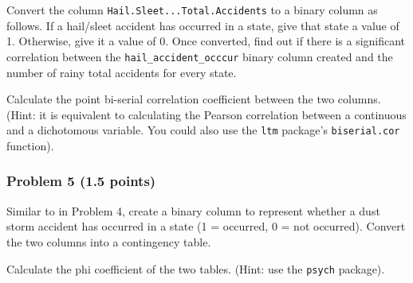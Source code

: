 \documentclass[
]{article}
\begin{document}
Convert the column \texttt{Hail.Sleet...Total.Accidents} to a binary
column as follows. If a hail/sleet accident has occurred in a state,
give that state a value of 1. Otherwise, give it a value of 0. Once
converted, find out if there is a significant correlation between the
\texttt{hail\_accident\_occcur} binary column created and the number of
rainy total accidents for every state.

Calculate the point bi-serial correlation coefficient between the two
columns. (Hint: it is equivalent to calculating the Pearson correlation
between a continuous and a dichotomous variable. You could also use the
\texttt{ltm} package's \texttt{biserial.cor} function).

\hypertarget{problem-5-1.5-points}{%
\subsubsection{Problem 5 (1.5 points)}\label{problem-5-1.5-points}}

Similar to in Problem 4, create a binary column to represent whether a
dust storm accident has occurred in a state (1 = occurred, 0 = not
occurred). Convert the two columns into a contingency table.

Calculate the phi coefficient of the two tables. (Hint: use the
\texttt{psych} package).
\end{document}
